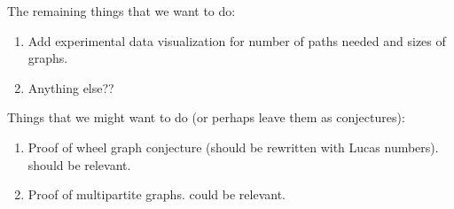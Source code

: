 \documentclass[11pt,reqno]{amsart}
\DeclareMathOperator{\Pic}{Pic}
\DeclareMathOperator{\Jac}{Jac}
\theoremstyle{definition}
\newtheorem*{goal}{Goal}
\theoremstyle{plain}
\begin{document}
The remaining things that we want to do:
\begin{enumerate}
	\item 
Add experimental data visualization for number of paths needed and sizes of graphs. 
	\item 
Anything else??
\end{enumerate}

Things that we might want to do (or perhaps leave them as conjectures):
\begin{enumerate}
	\item 
Proof of wheel graph conjecture (should be rewritten with Lucas numbers). \cite{biggs1999chip} should be relevant. 
\item 
Proof of multipartite graphs. \cite{jacobson2003critical} could be relevant. 
\end{enumerate}



\end{document}
